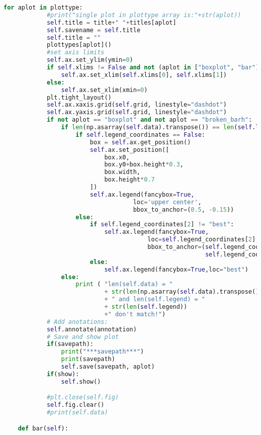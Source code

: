\begin{lstlisting}[language=Python,caption=myplot.py]
        for aplot in plottype:
            #print("single plot in plottype array is:"+str(aplot))
            self.title = title+" "+titles[aplot]
            self.savename = self.title
            self.title = ""
            plottypes[aplot]()
            #set axis limits
            self.ax.set_ylim(ymin=0)
            if self.xlims != False and not (aplot in ["boxplot", "bar"]):
                self.ax.set_xlim(self.xlims[0], self.xlims[1])
            else:
                self.ax.set_xlim(xmin=0)
            plt.tight_layout()
            self.ax.xaxis.grid(self.grid, linestyle="dashdot")
            self.ax.yaxis.grid(self.grid, linestyle="dashdot")
            if not aplot == "boxplot" and not aplot == "broken_barh":
                if len(np.asarray(self.data).transpose()) == len(self.legend):
                    if self.legend_coordinates == False:
                        box = self.ax.get_position()
                        self.ax.set_position([
                            box.x0,
                            box.y0+box.height*0.3,
                            box.width,
                            box.height*0.7
                        ])
                        self.ax.legend(fancybox=True,
                                    loc='upper center',
                                    bbox_to_anchor=(0.5, -0.15))
                    else:
                        if self.legend_coordinates[2] != "best":
                            self.ax.legend(fancybox=True,
                                        loc=self.legend_coordinates[2],
                                        bbox_to_anchor=(self.legend_coordinates[0],
                                                        self.legend_coordinates[1]))
                        else:
                            self.ax.legend(fancybox=True,loc="best")
                else:
                    print ( "len(self.data) = "
                            + str(len(np.asarray(self.data).transpose()))
                            + " and len(self.legend) = "
                            + str(len(self.legend))
                            +" don't match!")
            # Add anotations:
			self.annotate(annotation)
            # Save and show plot
            if(savepath):
                print("***savepath***")
                print(savepath)
                self.save(savepath, aplot)
            if(show):
                self.show()

            #plt.close(self.fig)
            self.fig.clear()
            #print(self.data)

    def bar(self):


\end{lstlisting}
